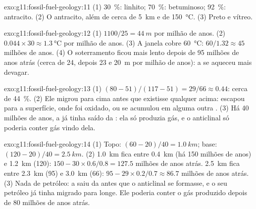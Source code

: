 \begin{solution}{exo:g11:fossil-fuel-geology:11}
(1) \qty{30}{\percent}: linhito; \qty{70}{\percent}:  betuminoso;
\qty{92}{\percent}: antracito. (2) O antracito, além de cerca de
\qty{5}{km} e de \qty{150}{\degreeCelsius}. (3) Preto e vítreo.
\end{solution}

\begin{solution}{exo:g11:fossil-fuel-geology:12}
(1) $1100/25 = \qty{44}{m}$ por milhão de anos. (2) $0.044 \times 30
\approx \qty{1.3}{\degreeCelsius}$ por milhão de anos. (3) A janela cobre
\qty{60}{\degreeCelsius}: $60/1.32 \approx 45$ milhões de anos. (4) O
soterramento ficou mais lento depois de 95 milhões de anos atrás (cerca de
24, depois 23 e \qty{20}{m} por milhão de anos): a  se
aqueceu mais devagar.
\end{solution}

\begin{solution}{exo:g11:fossil-fuel-geology:13}
(1) $(80 - 51)/(117 - 51) = 29/66 \approx 0.44$: cerca de \qty{44}{\percent}.
(2) Ele migrou para cima antes que existisse qualquer  acima: escapou
para a superfície, onde foi oxidado, ou se acumulou em alguma outra
. (3) Há 40 milhões de anos, a  já tinha saído da
: ela só produzia gás, e o anticlinal só poderia conter
gás vindo dela.
\end{solution}

\begin{solution}{exo:g11:fossil-fuel-geology:14}
(1) Topo: $(60 - 20)/40 = \qty{1.0}{km}$; base: $(120 - 20)/40 =
\qty{2.5}{km}$. (2) \qty{1.0}{km} fica entre \qty{0.4}{km} (há 150 milhões
de anos) e \qty{1.2}{km} (120): $150 - 30 \times 0.6/0.8 = 127.5$
milhões de anos atrás. \qty{2.5}{km} fica entre \qty{2.3}{km} (95) e
\qty{3.0}{km} (66): $95 - 29 \times 0.2/0.7 \approx 86.7$ milhões de anos
atrás. (3) Nada de petróleo: a  saiu da 
antes que o anticlinal se formasse, e o seu petróleo já tinha migrado para
longe. Ele poderia conter o gás produzido depois de 80 milhões de anos atrás.
\end{solution}

